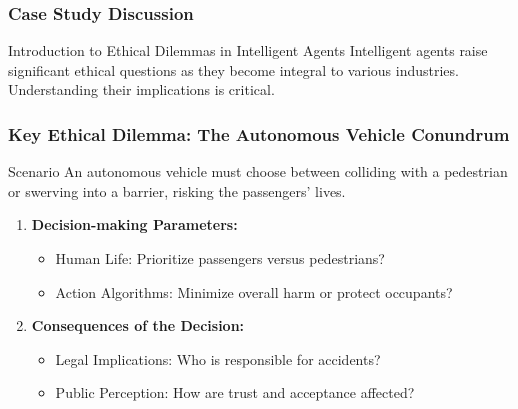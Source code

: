 \documentclass[aspectratio=169]{beamer}
\begin{document}
\begin{frame}[fragile]
    \frametitle{Case Study Discussion}
    \begin{block}{Introduction to Ethical Dilemmas in Intelligent Agents}
        Intelligent agents raise significant ethical questions as they become integral to various industries. Understanding their implications is critical.
    \end{block}
\end{frame}

\begin{frame}[fragile]
    \frametitle{Key Ethical Dilemma: The Autonomous Vehicle Conundrum}
    \begin{block}{Scenario}
        An autonomous vehicle must choose between colliding with a pedestrian or swerving into a barrier, risking the passengers' lives.
    \end{block}
    
    \begin{enumerate}
        \item \textbf{Decision-making Parameters:}
        \begin{itemize}
            \item Human Life: Prioritize passengers versus pedestrians?
            \item Action Algorithms: Minimize overall harm or protect occupants?
        \end{itemize}
        
        \item \textbf{Consequences of the Decision:}
        \begin{itemize}
            \item Legal Implications: Who is responsible for accidents?
            \item Public Perception: How are trust and acceptance affected?
        \end{itemize}
    \end{enumerate}
\end{frame}
\end{document}
